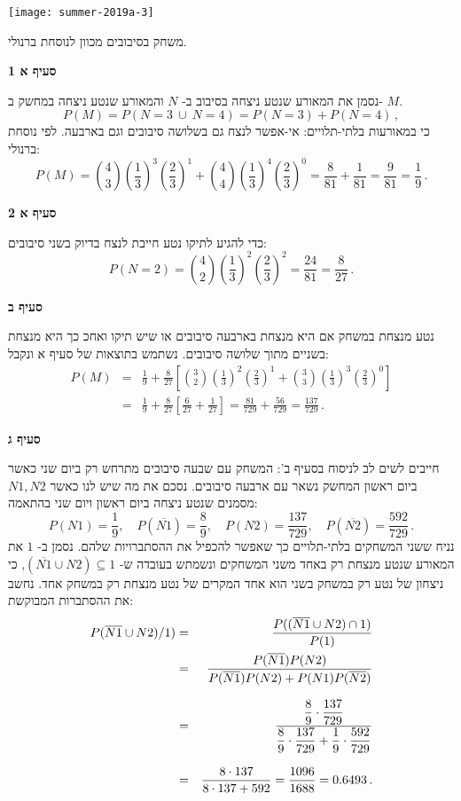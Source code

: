 \begin{center}
\texttt{[image: summer-2019a-3]}
\end{center}

משחק בסיבובים מכוון לנוסחת ברנולי.

\textbf{סעיף א 1}

נסמן את המאורע שנטע ניצחה בסיבוב ב-%
$N$
והמאורע שנטע ניצחה במחשק ב-%
$M$.
\[
P(M) = P(N=3 \:\cup\: N=4)=P(N=3)+P(N=4)\,,
\]
כי במאורעות בלתי-תלויים: אי-אפשר לנצח גם בשלושה סיבובים וגם בארבעה. לפי נוסחת ברנולי:
\[
P(M)={4\choose 3}\left(\frac{1}{3}\right)^3\left(\frac{2}{3}\right)^1+
{4\choose 4}\left(\frac{1}{3}\right)^4\left(\frac{2}{3}\right)^0=
\frac{8}{81}+\frac{1}{81}=\frac{9}{81}=\frac{1}{9}\,.
\]

\textbf{סעיף א 2}

כדי להגיע לתיקו נטע חייבת לנצח בדיוק בשני סיבובים:
\[
P(N=2)={4\choose 2}\left(\frac{1}{3}\right)^2\left(\frac{2}{3}\right)^2=\frac{24}{81}=\frac{8}{27}\,.
\]

\textbf{סעיף ב}

נטע מנצחת במשחק אם היא מנצחת בארבעה סיבובים או שיש תיקו ואחכ כך היא מנצחת בשניים מתוך שלושה סיבובים. נשתמש בתוצאות של סעיף א ונקבל:
\begin{eqnarray*}
P(M)&=&\frac{1}{9}+\frac{8}{27}
  \left[{3\choose 2}\left(\frac{1}{3}\right)^2\left(\frac{2}{3}\right)^1  +
  {3\choose 3}\left(\frac{1}{3}\right)^3\left(\frac{2}{3}\right)^0
  \right]\\
  &=&\frac{1}{9}+\frac{8}{27}
  \left[ \frac{6}{27} + \frac{1}{27} \right]=
  \frac{81}{729}+\frac{56}{729}=\frac{137}{729}\,.
\end{eqnarray*}

\textbf{סעיף ג}

חייבים לשים לב לניסוח בסעיף ב': המשחק עם שבעה סיבובים מתרחש רק ביום שני כאשר ביום ראשון המחשק נשאר עם ארבעה סיבובים. נסכם את מה שיש לנו כאשר 
$N1, N2$
מסמנים שנטע ניצחה ביום ראשון ויום שני בהתאמה:
\[
P(N1) = \frac{1}{9},\quad P(\overline{N1})=\frac{8}{9},\quad 
P(N2) = \frac{137}{729}, \quad P(\overline{N2})=\frac{592}{729}\,.
\]
נניח ששני המשחקים בלתי-תלויים כך שאפשר להכפיל את ההסתברויות שלהם. 
נסמן ב-%
$1$
את המאורע שנטע מנצחת רק באחד משני המשחקים ונשמתש בעובדה ש-%
$(\overline{N1}\cup N2) \subseteq 1$,
כי ניצחון של נטע רק במשחק בשני הוא אחד המקרים של נטע מנצחת רק במשחק אחד. נחשב את ההסתברות המבוקשת:
\begin{eqnarray*}
P(\overline{N1}\cup N2) / 1) &=& 
\frac{P((\overline{N1}\cup N2) \cap 1)}{P(1)}\\
&=& \frac{P(\overline{N1})P(N2)}
{P(\overline{N1})P(N2)+P(N1)P(\overline{N2})}\\[8pt]
&=&\frac{\displaystyle\frac{8}{9}\cdot \frac{137}{729}}
{\displaystyle\frac{8}{9}\cdot \frac{137}{729}+\displaystyle\frac{1}{9}\cdot \frac{592}{729}}\\[8pt]
&=&\frac{8\cdot 137}{8\cdot 137+592}=\frac{1096}{1688}=0.6493\,.
\end{eqnarray*}

